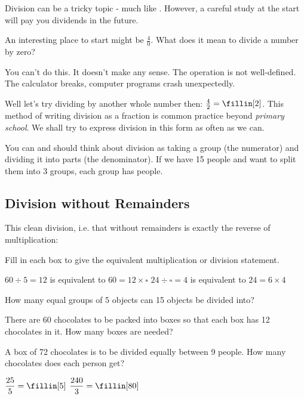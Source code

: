 \begin{doublespace}
    Division can be a tricky topic - much like \raisebox{-.6ex}{\em negative numbers}. However, a careful study at the start will pay you dividends in the future.
\end{doublespace}

An interesting place to start might be $\displaystyle \frac{4}{0}$. What does it mean to divide a number by zero?
\begin{solutionordottedlines}[1in]
    You can't do this. It doesn't make any sense. The operation is not well-defined. The calculator breaks, computer programs crash unexpectedly.
\end{solutionordottedlines}

Well let's try dividing by another whole number then: $\frac{4}{2} = \fillin[2]$. This method of writing division as a fraction is common practice beyond \emph{primary school}. We shall try to express division in this form as often as we can.

You can and should think about division as taking a group (the numerator) and dividing it into parts (the denominator). If we have 15 people and want to split them into 3 groups, each group has \fillin[5] people.

\subsection{Division without Remainders}
This clean division, i.e. that without remainders is exactly the reverse of multiplication:

\begin{examples}
\begin{questions}
    \question Fill in each box to give the equivalent multiplication or division statement.
    \begin{parts}
        \Part[1] \(60 \div 5=12\) is equivalent to \(60=12 \times \square\)
        \Part[1] \(24 \div \square=4\) is equivalent to \(24=6 \times 4\)
    \end{parts}
    \Question[1] How many equal groups of 5 objects can 15 objects be divided into?
    \begin{solutionorbox}[1in]
    \end{solutionorbox}
    \Question[1] There are 60 chocolates to be packed into boxes so that each box has 12 chocolates in it. How many boxes are needed?
    \begin{solutionorbox}[1in]
    \end{solutionorbox}
    \Question[1] A box of 72 chocolates is to be divided equally between 9 people. How many chocolates does each person get?
    \begin{solutionorbox}[1in]
    \end{solutionorbox}
    \Question[1] \(\displaystyle\frac{25}{5}=\fillin[5]\)
    \Question[1] \(\displaystyle\frac{240}{3}=\fillin[80]\)
\end{questions}
\end{examples}

